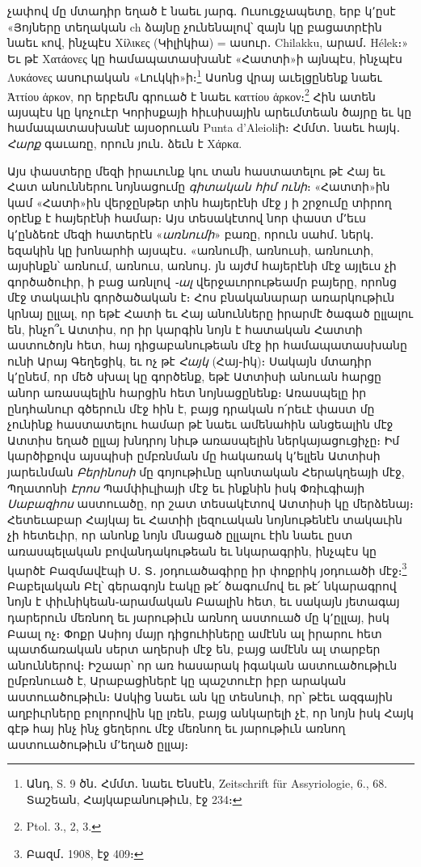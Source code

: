 \documentclass{article}
\begin{document}
{չափով մը մտադիր եղած է նաեւ յարգ․ Ուսուցչապետը, երբ կ՚ըսէ «Յոյները տեղական ch ձայնը չունենալով՝ զայն կը բացատրէին նաեւ κով, ինչպէս Χίλικες (Կիլիկիա) = ասուր․ Chilakku, արամ․ Hélek։» Եւ թէ Χατάονες կը համապատասխանէ «Հատտի»ի այնպէս, ինչպէս Λυκάονες ասուրական «Լուկկի»ի։\footnote{Անդ, S. 9 ծն․ Հմմտ․ նաեւ Ենսէն, Zeitschrift für Assyriologie, 6., 68. Տաշեան, Հայկաբանութիւն, էջ 234։} Ասոնց վրայ աւելցընենք նաեւ Ἀττίου ἀρκον, որ երբեմն գրուած է նաեւ καττίου ἀρκον։\footnote{Ptol. 3., 2, 3.} Հին ատեն այսպէս կը կոչուէր Կորիսքայի հիւսիսային արեւմտեան ծայրը եւ կը համապատասխանէ այսօրուան Punta d'Aleioliի։ Հմմտ․ նաեւ հայկ․ \emph{Հարք} գաւառը, որուն յուն․ ձեւն է Χάρκα.

Այս փաստերը մեզի իրաւունք կու տան հաստատելու թէ Հայ եւ Հատ անուններու նոյնացումը \emph{գիտական հիմ ունի}։ «Հատտի»ին կամ «Հատի»ին վերջընթեր տին հայերէնի մէջ յ ի շրջումը տիրող օրէնք է հայերէնի համար։ Այս տեսակէտով նոր փաստ մ՚եւս կ՚ընձեռէ մեզի հատերէն «\emph{առնումի}» բառը, որուն սահմ․ ներկ․ եզակին կը խոնարհի այսպէս․ «առնումի, առնուսի, առնուտի, այսինքն՝ առնում, առնուս, առնույ․ յն այժմ հայերէնի մէջ այլեւս չի գործածուիր, ի բաց առնլով \emph{֊ալ} վերջաւորութեամր բայերը, որոնց մէջ տակաւին գործածական է։ Հոս բնականարար առարկութիւն կրնայ ըլլալ, որ եթէ Հատի եւ Հայ անունները իրարմէ ծագած ըլլալու են, ինչո՞ւ Ատտիս, որ իր կարգին նոյն է հատական Հատտի աստուծոյն հետ, հայ դիցաբանութեան մէջ իր համապատասխանը ունի Արայ Գեղեցիկ, եւ ոչ թէ \emph{Հայկ} (Հայ֊իկ)։ Սակայն մտադիր կ՚ընեմ, որ մեծ սխալ կը գործենք, եթէ Ատտիսի անուան հարցը անոր առասպելին հարցին հետ նոյնացընենք։ Առասպելը իր ընդհանուր գծերուն մէջ հին է, բայց դրական ո՛րեւէ փաստ մը չունինք հաստատելու համար թէ նաեւ ամենահին անցեալին մէջ Ատտիս եղած ըլլայ խնդրոյ նիւթ առասպելին ներկայացուցիչը։ Իմ կարծիքովս այսպիսի ըմբռնման մը հակառակ կ՚ելլեն Ատտիսի յարեւնման \emph{Բերինոսի} մը գոյութիւնը պոնտական Հերակղեայի մէջ, Պղատոնի \emph{Էրոս} Պամփիւլիայի մէջ եւ ինքնին իսկ Փռիւգիայի \emph{Սաբազիոս} աստուածը, որ շատ տեսակէտով Ատտիսի կը մերձենայ։ Հետեւաբար Հայկայ եւ Հատիի լեզուական նոյնութենէն տակաւին չի հետեւիր, որ անոնք նոյն մնացած ըլլալու էին նաեւ ըստ առասպելական բովանդակութեան եւ նկարագրին, ինչպէս կը կարծէ Բազմավէպի Ս․ Տ․ յօդուածագիրը իր փոքրիկ յօդուածի մէջ։\footnote{Բազմ․ 1908, էջ 409։} Բաբելական Բէլ՝ գերագոյն էակը թէ՛ ծագումով եւ թէ՛ նկարագրով նոյն է փիւնիկեան֊արամական Բաալին հետ, եւ սակայն յետագայ դարերուն մեռնող եւ յարութիւն առնող աստուած մը կ՚ըլլայ, իսկ Բաալ ոչ։ Փոքր Ասիոյ մայր դիցուհիները ամէնն ալ իրարու հետ պատճառական սերտ աղերսի մէջ են, բայց ամէնն ալ տարբեր անուններով։ Իշաար՝ որ առ հասարակ իգական աստուածութիւն ըմբռնուած է, Արաբացիներէ կը պաշտուէր իբր արական աստուածութիւն։ Ասկից նաեւ ան կը տեսնուի, որ՝ թէեւ ազգային աղբիւրները բոլորովին կը լռեն, բայց անկարելի չէ, որ նոյն իսկ Հայկ գէթ հայ ինչ ինչ ցեղերու մէջ մեռնող եւ յարութիւն առնող աստուածութիւն մ՚եղած ըլլայ։

}
\end{document}
